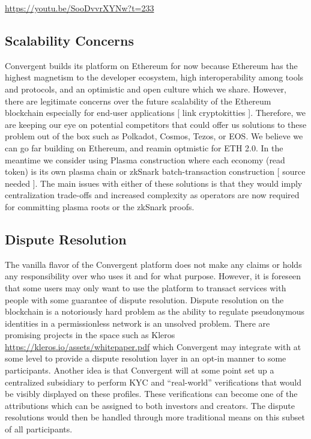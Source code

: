 \documentclass[a4paper, 10pt]{article}
\begin{document}
\url{https://youtu.be/SooDvvrXYNw?t=233}

\subsection{Scalability Concerns}

Convergent builds its platform on Ethereum for now because Ethereum has the highest magnetism to the developer ecosystem, high interoperability among tools and protocols, and an optimistic and open culture which we share. However, there are legitimate concerns over the future scalability of the Ethereum blockchain especially for end-user applications [ link cryptokitties ]. Therefore, we are keeping our eye on potential competitors that could offer us solutions to these problem out of the box such as Polkadot, Cosmos, Tezos, or EOS. We believe we can go far building on Ethereum, and reamin optmistic for ETH 2.0. In the meantime we consider using Plasma construction where each economy (read token) is its own plasma chain or zkSnark batch-transaction construction [ source needed ]. The main issues with either of these solutions is that they would imply centralization trade-offs and increased complexity as operators are now required for committing plasma roots or the zkSnark proofs. 

\subsection{Dispute Resolution}

The vanilla flavor of the Convergent platform does not make any claims or holds any responsibility over who uses it and for what purpose. However, it is foreseen that some users may only want to use the platform to transact services with people with some guarantee of dispute resolution. Dispute resolution on the blockchain is a notoriously hard problem as the ability to regulate pseudonymous identities in a permissionless network is an unsolved problem. There are promising projects in the space such as Kleros \url{https://kleros.io/assets/whitepaper.pdf} which Convergent may integrate with at some level to provide a dispute resolution layer in an opt-in manner to some participants. Another idea is that Convergent will at some point set up a centralized subsidiary to perform KYC and “real-world” verifications that would be visibly displayed on these profiles. These verifications can become one of the attributions which can be assigned to both investors and creators. The dispute resolutions would then be handled through more traditional means on this subset of all participants.
\end{document}
